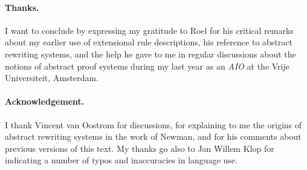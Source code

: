 \documentclass[envcountsame,runningheads]{llncs}
\begin{document}
\paragraph{Thanks.}
I want to conclude by expressing my gratitude to Roel 
for his critical remarks about my earlier use of extensional rule descriptions,
his reference to abstract rewriting systems,
and the help he gave to me in regular discussions about the notions
of abstract proof systems during my last year as an \emph{AIO}
at the Vrije Universiteit, Amsterdam.


\paragraph{Acknowledgement.}
I thank Vincent van Oostrom for discussions,
  for explaining to me the origins of abstract rewriting systems
  in the work of Newman,
  and for his comments about previous versions of this text.
  My thanks go also to Jan Willem Klop for indicating a number of
  typos and inaccuracies in language use. 




\end{document}
